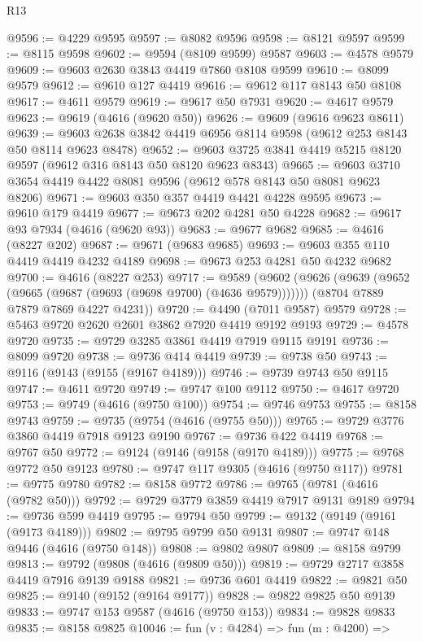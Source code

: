 \begin{lexlean}{R13}
\begin{coremodule}
@9596 := @4229 @9595
@9597 := @8082 @9596
@9598 := @8121 @9597
@9599 := @8115 @9598
@9602 := @9594 (@8109 @9599) @9587
@9603 := @4578 @9579
@9609 := @9603 @2630 @3843 @4419 @7860 @8108 @9599
@9610 := @8099 @9579
@9612 := @9610 @127 @4419
@9616 := @9612 @117 @8143 @50 @8108
@9617 := @4611 @9579
@9619 := @9617 @50 @7931
@9620 := @4617 @9579
@9623 := @9619 (@4616 (@9620 @50))
@9626 := @9609 (@9616 @9623 @8611)
@9639 := @9603 @2638 @3842 @4419 @6956 @8114 @9598 (@9612 @253 @8143 @50 @8114 @9623 @8478)
@9652 := @9603 @3725 @3841 @4419 @5215 @8120 @9597 (@9612 @316 @8143 @50 @8120 @9623 @8343)
@9665 := @9603 @3710 @3654 @4419 @4422 @8081 @9596 (@9612 @578 @8143 @50 @8081 @9623 @8206)
@9671 := @9603 @350 @357 @4419 @4421 @4228 @9595
@9673 := @9610 @179 @4419
@9677 := @9673 @202 @4281 @50 @4228
@9682 := @9617 @93 @7934 (@4616 (@9620 @93))
@9683 := @9677 @9682
@9685 := @4616 (@8227 @202)
@9687 := @9671 (@9683 @9685)
@9693 := @9603 @355 @110 @4419 @4419 @4232 @4189
@9698 := @9673 @253 @4281 @50 @4232 @9682
@9700 := @4616 (@8227 @253)
@9717 := @9589
    (@9602
      (@9626 (@9639 (@9652 (@9665 (@9687 (@9693 (@9698 @9700) (@4636 @9579)))))))
      (@8704 @7889 @7879 @7869 @4227 @4231))
@9720 := @4490 (@7011 @9587) @9579
@9728 := @5463 @9720 @2620 @2601 @3862 @7920 @4419 @9192 @9193
@9729 := @4578 @9720
@9735 := @9729 @3285 @3861 @4419 @7919 @9115 @9191
@9736 := @8099 @9720
@9738 := @9736 @414 @4419
@9739 := @9738 @50
@9743 := @9116 (@9143 (@9155 (@9167 @4189)))
@9746 := @9739 @9743 @50 @9115
@9747 := @4611 @9720
@9749 := @9747 @100 @9112
@9750 := @4617 @9720
@9753 := @9749 (@4616 (@9750 @100))
@9754 := @9746 @9753
@9755 := @8158 @9743
@9759 := @9735 (@9754 (@4616 (@9755 @50)))
@9765 := @9729 @3776 @3860 @4419 @7918 @9123 @9190
@9767 := @9736 @422 @4419
@9768 := @9767 @50
@9772 := @9124 (@9146 (@9158 (@9170 @4189)))
@9775 := @9768 @9772 @50 @9123
@9780 := @9747 @117 @9305 (@4616 (@9750 @117))
@9781 := @9775 @9780
@9782 := @8158 @9772
@9786 := @9765 (@9781 (@4616 (@9782 @50)))
@9792 := @9729 @3779 @3859 @4419 @7917 @9131 @9189
@9794 := @9736 @599 @4419
@9795 := @9794 @50
@9799 := @9132 (@9149 (@9161 (@9173 @4189)))
@9802 := @9795 @9799 @50 @9131
@9807 := @9747 @148 @9446 (@4616 (@9750 @148))
@9808 := @9802 @9807
@9809 := @8158 @9799
@9813 := @9792 (@9808 (@4616 (@9809 @50)))
@9819 := @9729 @2717 @3858 @4419 @7916 @9139 @9188
@9821 := @9736 @601 @4419
@9822 := @9821 @50
@9825 := @9140 (@9152 (@9164 @9177))
@9828 := @9822 @9825 @50 @9139
@9833 := @9747 @153 @9587 (@4616 (@9750 @153))
@9834 := @9828 @9833
@9835 := @8158 @9825
@10046 := fun (v : @4284) =>
  fun (m : @4200) =>

\end{coremodule}
\end{lexlean}
